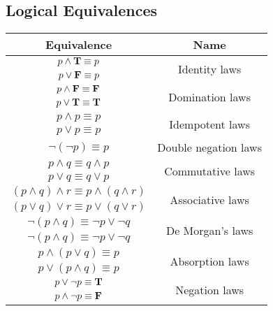   \subsection{Logical Equivalences}
    \begin{center}
      \begin{tabular}{|c|c|}
        \hline
        \textbf{Equivalence} & \textbf{Name} \\
        \hline

        $p \land \mathbf{T} \equiv p$ & \multirow{2}{*}{Identity laws} \\
        $p \lor \mathbf{F} \equiv p$ & \\
        \hline

        $p \land \mathbf{F} \equiv \mathbf{F}$ & \multirow{2}{*}{Domination laws} \\
        $p \lor \mathbf{T} \equiv \mathbf{T}$ & \\
        \hline

        $p \land p \equiv p$ & \multirow{2}{*}{Idempotent laws} \\
        $p \lor p \equiv p$ & \\
        \hline

        $\lnot (\lnot p) \equiv p$ & Double negation laws \\
        \hline

        $p \land q \equiv q \land p$ & \multirow{2}{*}{Commutative laws} \\
        $p \lor q \equiv q \lor p$ & \\
        \hline

        $(p \land q) \land r \equiv p \land (q \land r)$
          & \multirow{2}{*}{Associative laws} \\
        $(p \lor q) \lor r \equiv p \lor (q \lor r)$ & \\
        \hline

        $\lnot (p \land q) \equiv \lnot p \lor \lnot q$
          & \multirow{2}{*}{De Morgan's laws} \\
        $\lnot (p \land q) \equiv \lnot p \lor \lnot q$ & \\
        \hline

        $p \land (p \lor q) \equiv p$
          & \multirow{2}{*}{Absorption laws} \\
        $p \lor (p \land q) \equiv p$ & \\
        \hline

        $p \lor \lnot p \equiv \mathbf{T}$ & \multirow{2}{*}{Negation laws} \\
        $p \land \lnot p \equiv \mathbf{F}$ & \\
        \hline


\end{tabular}
\end{center}
